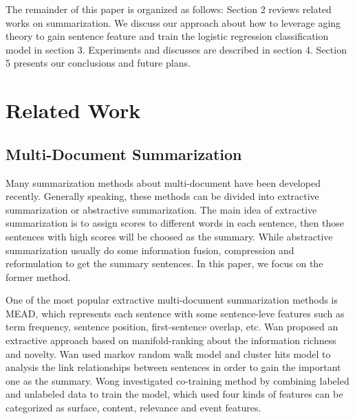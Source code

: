 \documentclass{acm_proc_article-sp}
\begin{document}
The remainder of this paper is organized as follows: Section 2 reviews related works on summarization. 
We discuss our approach about how to leverage aging theory to gain sentence feature and train the logistic regression classification model in section 3. 
Experiments and discusses are described in section 4. 
Section 5 presents our conclusions and future plans.


%
\section{Related Work}

\subsection{Multi-Document Summarization}

Many summarization methods about multi-document have been developed recently. 
Generally speaking, these methods can be divided into extractive summarization or abstractive summarization.
The main idea of extractive summarization is to assign scores to different words in each sentence, then those sentences with high scores will be choosed as the summary.
While abstractive summarization usually do some information fusion\cite{barzilay1999information}, compression\cite{2002-Knight-p91-107} and reformulation\cite{mckeown1999towards} to get the summary sentences.
In this paper, we focus on the former method.

One of the most popular extractive multi-document summarization methods is MEAD\cite{2004-Radev-p919-938}, which represents each sentence with some sentence-leve features such as term frequency, sentence position, first-sentence overlap, etc. 
Wan\cite{wan2007manifold} proposed an extractive approach based on manifold-ranking about the information richness and novelty.
Wan\cite{2008-Wan-p299-306} used markov random walk model and cluster hits model to analysis the link relationships between sentences in order to gain the important one as the summary. 
Wong\cite{2008-Wong-p985-992} investigated co-training method by combining labeled and unlabeled data to train the model, which used four kinds of features can be categorized as surface, content, relevance and event features.
\end{document}
